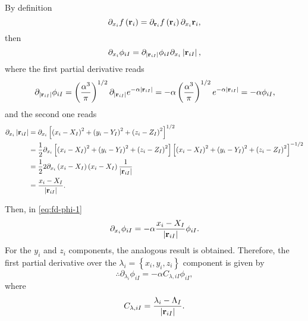 By definition
\begin{equation}
    \partial_{x_{i}} f\left( \boldsymbol{\mathrm{r}}_i \right)
    =
    \partial_{\boldsymbol{\mathrm{r}}_{i}} f\left( \boldsymbol{\mathrm{r}}_i \right) \partial_{x_{i}} \boldsymbol{\mathrm{r}}_{i}
    ,
\end{equation}
then 
\begin{equation} \label{eq:fd-phi-1}
    \partial_{x_{i}} \phi_{iI}
    =
    \partial_{\left| \boldsymbol{\mathrm{r}}_{iI} \right|} \phi_{iI} \partial_{x_{i}} \left| \boldsymbol{\mathrm{r}}_{iI} \right|
    ,
\end{equation}
where the first partial derivative reads 
\begin{equation}
    \partial_{\left| \boldsymbol{\mathrm{r}}_{iI} \right|} \phi_{iI}
    =
    \left( \frac{\alpha^3}{\pi} \right)^{1 /2}
    \partial_{\left| \boldsymbol{\mathrm{r}}_{iI} \right|} 
    e^{-\alpha \left| \boldsymbol{\mathrm{r}}_{iI} \right|}
    =
    -\alpha
    \left( \frac{\alpha^3}{\pi} \right)^{1 /2}
    e^{-\alpha \left| \boldsymbol{\mathrm{r}}_{iI} \right|}
    =
    -\alpha \phi_{iI}
    ,
\end{equation}
and the second one reads 
\begin{align} \label{eq:partial-xi-riI}
    \notag
    \partial_{x_{i}} \left| \boldsymbol{\mathrm{r}}_{iI} \right|
    &=
    \partial_{x_{i}} \left[ \left( x_i - X_I \right)^{2} + \left( y_i - Y_I \right)^{2} + \left( z_i - Z_I \right)^{2}  \right]^{1 /2}
    \\
    \notag
    &=
    \frac{1}{2} \partial_{x_{i}} \left[ \left( x_i - X_I \right)^{2} + \left( y_i - Y_I \right)^{2} + \left( z_i - Z_I \right)^{2}  \right] \left[ \left( x_i - X_I \right)^{2} + \left( y_i - Y_I \right)^{2} + \left( z_i - Z_I \right)^{2}  \right]^{-1 /2}
    \\
    \notag
    &=
    \frac{1}{2} 2 \partial_{x_{i}} \left( x_i - X_I \right) \left( x_i - X_I \right) \frac{1}{\left| \boldsymbol{\mathrm{r}}_{iI} \right|}
    \\
    &=
    \frac{x_i - X_I}{\left| \boldsymbol{\mathrm{r}}_{iI} \right|}
    .
\end{align}

Then, in \cref{eq:fd-phi-1}
\begin{equation} \label{eq:partial-phi-xi}
    \partial_{x_{i}} \phi_{iI}
    =
    -\alpha
    \frac{x_i - X_I}{\left| \boldsymbol{\mathrm{r}}_{iI} \right|}
    \phi_{iI} 
    .
\end{equation}
For the $y_i$ and $z_i$ components, the analogous result is obtained.
Therefore, the first partial derivative over the 
$\lambda_i = \left\{ x_i, y_i, z_i \right\}$
component is given by
\begin{equation} \label{eq:partial-phi-lambda}
    \therefore
    \partial_{\lambda_{i}} \phi_{iI}
    =
    -\alpha
    C_{\lambda,iI}
    \phi_{iI}
    ,
\end{equation}
where 
\begin{equation} \label{eq:definition-CiI}
    C_{\lambda,iI} =
    \frac{\lambda_i - \Lambda_I}{\left| \boldsymbol{\mathrm{r}}_{iI} \right|}
    .
\end{equation}

